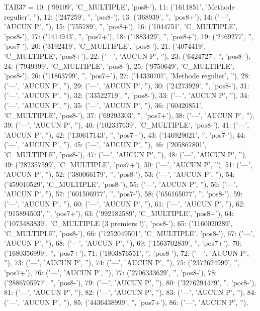 \documentclass[11pt,a4paper]{article}
\begin{document}
\begin{pycode}
TAB37 = {10: ('99109', 'C_MULTIPLE', 'pos8-'),
 11: ('1611851', 'Methode regulier', ''),
 12: ('247259', '', 'pos8-'),
 13: ('368939', '', 'pos8+'),
 14: ('---', 'AUCUN P', ''),
 15: ('755789', '', 'pos8+'),
 16: ('1044751', 'C_MULTIPLE', 'pos8-'),
 17: ('1414943', '', 'pos7+'),
 18: ('1883429', '', 'pos8+'),
 19: ('2469277', '', 'pos7-'),
 20: ('3192419', 'C_MULTIPLE', 'pos8-'),
 21: ('4074419', 'C_MULTIPLE', 'pos8+'),
 22: ('---', 'AUCUN P', ''),
 23: ('6424727', '', 'pos8-'),
 24: ('7949399', 'C_MULTIPLE', 'pos8-'),
 25: ('9750649', 'C_MULTIPLE', 'pos8-'),
 26: ('11863799', '', 'pos7+'),
 27: ('14330707', 'Methode regulier', ''),
 28: ('---', 'AUCUN P', ''),
 29: ('---', 'AUCUN P', ''),
 30: ('24273929', '', 'pos8-'),
 31: ('---', 'AUCUN P', ''),
 32: ('33522719', '', 'pos8-'),
 33: ('---', 'AUCUN P', ''),
 34: ('---', 'AUCUN P', ''),
 35: ('---', 'AUCUN P', ''),
 36: ('60420851', 'C_MULTIPLE', 'pos8-'),
 37: ('69293303', '', 'pos7+'),
 38: ('---', 'AUCUN P', ''),
 39: ('---', 'AUCUN P', ''),
 40: ('102337639', 'C_MULTIPLE', 'pos8-'),
 41: ('---', 'AUCUN P', ''),
 42: ('130617143', '', 'pos7+'),
 43: ('146929021', '', 'pos7-'),
 44: ('---', 'AUCUN P', ''),
 45: ('---', 'AUCUN P', ''),
 46: ('205867801', 'C_MULTIPLE', 'pos8-'),
 47: ('---', 'AUCUN P', ''),
 48: ('---', 'AUCUN P', ''),
 49: ('282357599', 'C_MULTIPLE', 'pos7+'),
 50: ('---', 'AUCUN P', ''),
 51: ('---', 'AUCUN P', ''),
 52: ('380066179', '', 'pos8-'),
 53: ('---', 'AUCUN P', ''),
 54: ('459010529', 'C_MULTIPLE', 'pos8-'),
 55: ('---', 'AUCUN P', ''),
 56: ('---', 'AUCUN P', ''),
 57: ('601506977', '', 'pos7-'),
 58: ('656165077', '', 'pos8-'),
 59: ('---', 'AUCUN P', ''),
 60: ('---', 'AUCUN P', ''),
 61: ('---', 'AUCUN P', ''),
 62: ('915894503', '', 'pos7+'),
 63: ('992182589', 'C_MULTIPLE', 'pos8+'),
 64: ('1073483839', 'C_MULTIPLE (3 premiers !)', 'pos8-'),
 65: ('1160020289', 'C_MULTIPLE', 'pos8-'),
 66: ('1252049501', 'C_MULTIPLE', 'pos8-'),
 67: ('---', 'AUCUN P', ''),
 68: ('---', 'AUCUN P', ''),
 69: ('1563702839', '', 'pos7+'),
 70: ('1680356999', '', 'pos7+'),
 71: ('1803876551', '', 'pos8-'),
 72: ('---', 'AUCUN P', ''),
 73: ('---', 'AUCUN P', ''),
 74: ('---', 'AUCUN P', ''),
 75: ('2372624999', '', 'pos7+'),
 76: ('---', 'AUCUN P', ''),
 77: ('2706333629', '', 'pos8-'),
 78: ('2886705977', '', 'pos8-'),
 79: ('---', 'AUCUN P', ''),
 80: ('3276294479', '', 'pos8-'),
 81: ('---', 'AUCUN P', ''),
 82: ('---', 'AUCUN P', ''),
 83: ('---', 'AUCUN P', ''),
 84: ('---', 'AUCUN P', ''),
 85: ('4436438999', '', 'pos7+'),
 86: ('---', 'AUCUN P', ''),
}
\end{pycode}
\end{document}
